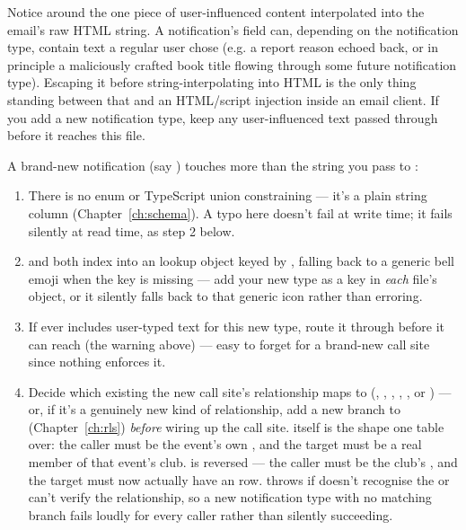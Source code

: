 \begin{olkwarn}
Notice  around the one piece of user-influenced content interpolated into the email's raw HTML string. A notification's  field can, depending on the notification type, contain text a regular user chose (e.g. a report reason echoed back, or in principle a maliciously crafted book title flowing through some future notification type). Escaping it before string-interpolating into HTML is the only thing standing between that and an HTML/script injection inside an email client. If you add a new notification type, keep any user-influenced text passed through  before it reaches this file.
\end{olkwarn}

\begin{olkhowto}
A brand-new notification  (say ) touches more than the string you pass to :
\begin{enumerate}
  \item There is no enum or TypeScript union constraining  — it's a plain string column (Chapter~\ref{ch:schema}). A typo here doesn't fail at write time; it fails silently at read time, as step 2 below.
  \item {} and  both index into an  lookup object keyed by , falling back to a generic bell emoji when the key is missing — add your new type as a key in \emph{each} file's  object, or it silently falls back to that generic icon rather than erroring.
  \item If  ever includes user-typed text for this new type, route it through  before it can reach  (the warning above) — easy to forget for a brand-new call site since nothing enforces it.
  \item Decide which existing  the new call site's relationship maps to (, , , , , or ) — or, if it's a genuinely new kind of relationship, add a new branch to  (Chapter~\ref{ch:rls}) \emph{before} wiring up the call site.  itself is the  shape one table over: the caller must be the event's own , and the target must be a real member of that event's club.  is  reversed — the caller must be the club's , and the target must now actually have an   row.  throws  if  doesn't recognise the  or can't verify the relationship, so a new notification type with no matching branch fails loudly for every caller rather than silently succeeding.
\end{enumerate}
\end{olkhowto}

